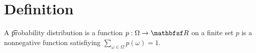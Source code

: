 

\section*{Definition}

A \t{probability distribution} is a function $p: \Omega  \to \R $ on a finite set $p$ is a nonnegative function satisfiying $\sum_{\omega  \in \Omega } p(\omega ) = 1$.

\blankpage